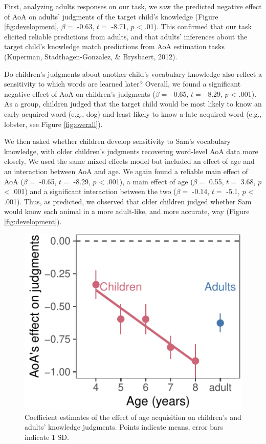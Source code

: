 \documentclass[10pt, letterpaper]{article}
\newenvironment{CodeChunk}{}{}
\begin{document}
First, analyzing adults responses on our task, we saw the predicted
negative effect of AoA on adults' judgments of the target child's
knowledge (Figure \ref{fig:development}, \(\beta =\) -0.63, \(t =\)
-8.71, \(p\) \textless{} .01). This confirmed that our task elicited
reliable predictions from adults, and that adults' inferences about the
target child's knowledge match predictions from AoA estimation tasks
(Kuperman, Stadthagen-Gonzalez, \& Brysbaert, 2012).

Do children's judgments about another child's vocabulary knowledge also
reflect a sensitivity to which words are learned later? Overall, we
found a significant negative effect of AoA on children's judgments
(\(\beta =\) -0.65, \(t =\) -8.29, \(p\) \textless{} .001). As a group,
children judged that the target child would be most likely to know an
early acquired word (e.g., dog) and least likely to know a late acquired
word (e.g., lobster, see Figure \ref{fig:overall}).

We then asked whether children develop sensitivity to Sam's vocabulary
knowledge, with older children's judgments recovering word-level AoA
data more closely. We used the same mixed effects model but included an
effect of age and an interaction between AoA and age. We again found a
reliable main effect of AoA (\(\beta =\) -0.65, \(t =\) -8.29, \(p\)
\textless{} .001), a main effect of age (\(\beta =\) 0.55, \(t =\) 3.68,
\(p\) \textless{} .001) and a significant interaction between the two
(\(\beta =\) -0.14, \(t =\) -5.1, \(p\) \textless{} .001). Thus, as
predicted, we observed that older children judged whether Sam would know
each animal in a more adult-like, and more accurate, way (Figure
\ref{fig:development}).

\begin{CodeChunk}
\begin{figure}[tb]
\includegraphics{figs/age_terms-1} \caption[Coefficient estimates of the effect of age acquisition on children's and adults' knowledge judgments]{Coefficient estimates of the effect of age acquisition on children's and adults' knowledge judgments. Points indicate means, error bars indicate 1 SD.}\label{fig:age_terms}
\end{figure}
\end{CodeChunk}
\end{document}
